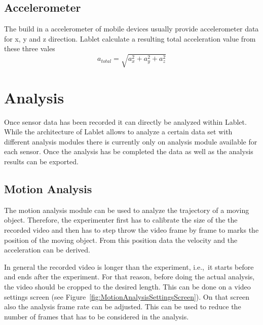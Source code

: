 \documentclass{sigchi}
\newcommand{\ie}{i.e.,\ }
\begin{document}
\subsection{Accelerometer}
The build in a accelerometer of mobile devices usually provide accelerometer data for x, y and z direction.
Lablet calculate a resulting total acceleration value from these three vales
\[
a_{total} = \sqrt{a_x^2 + a_y^2 + a_z^2}
\]

\section{Analysis}
Once sensor data has been recorded it can directly be analyzed within Lablet.
While the architecture of Lablet allows to analyze a certain data set with different analysis modules there is currently only on analysis module available for each sensor.
Once the analysis has be completed the data as well as the analysis results can be exported.

\subsection{Motion Analysis}
The motion analysis module can be used to analyze the trajectory of a moving object.
Therefore, the experimenter first has to calibrate the size of the the recorded video and then has to step throw the video frame by frame to marks the position of the moving object.
From this position data the velocity and the acceleration can be derived.

In general the recorded video is longer than the experiment, \ie it starts before and ends after the experiment.
For that reason, before doing the actual analysis, the video should be cropped to the desired length.
This can be done on a video settings screen (see Figure~\ref{fig:MotionAnalysisSettingsScreen}).
On that screen also the analysis frame rate can be adjusted.
This can be used to reduce the number of frames that has to be considered in the analysis.
\end{document}
